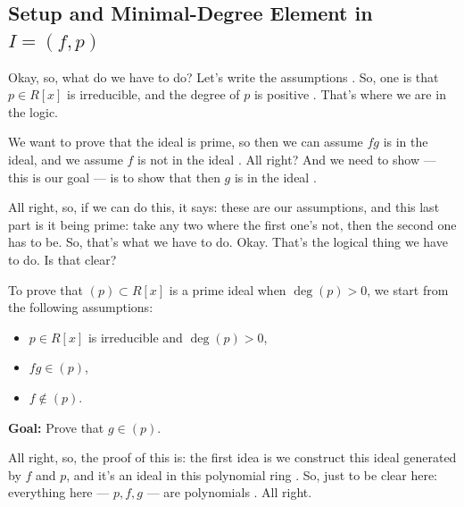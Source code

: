 \begin{proofWrapper}

\subsection{Setup and Minimal-Degree Element in \texorpdfstring{$I = (f, p)$}{I = (f, p)}}

\begin{speech}[00:15:33 - 00:16:43]
Okay, so, what do we have to do? Let's write the assumptions . So, one is that $p \in R[x]$ is irreducible, and the degree of $p$ is positive . That's where we are in the logic.

We want to prove that the ideal is prime, so then we can assume $fg$ is in the ideal, and we assume $f$ is not in the ideal . All right? And we need to show --- this is our goal  --- is to show that then $g$ is in the ideal .

All right, so, if we can do this, it says: these are our assumptions, and this last part is it being prime: take any two where the first one's not, then the second one has to be. So, that's what we have to do. Okay. That's the logical thing we have to do. Is that clear?
\end{speech}

\begin{content}
To prove that $(p) \subset R[x]$ is a prime ideal when $\deg(p) > 0$, we start from the following assumptions:
\begin{itemize}
    \item $p \in R[x]$ is irreducible and $\deg(p) > 0$,
    \item $fg \in (p)$,
    \item $f \notin (p)$.
\end{itemize}
\textbf{Goal:} Prove that $g \in (p)$.
\end{content}

\begin{speech}[00:16:43 - 00:18:50]
All right, so, the proof of this is: the first idea is we construct this ideal generated by $f$ and $p$, and it's an ideal in this polynomial ring . So, just to be clear here: everything here --- $p, f, g$ --- are polynomials . All right.


\end{speech}
\end{proofWrapper}
